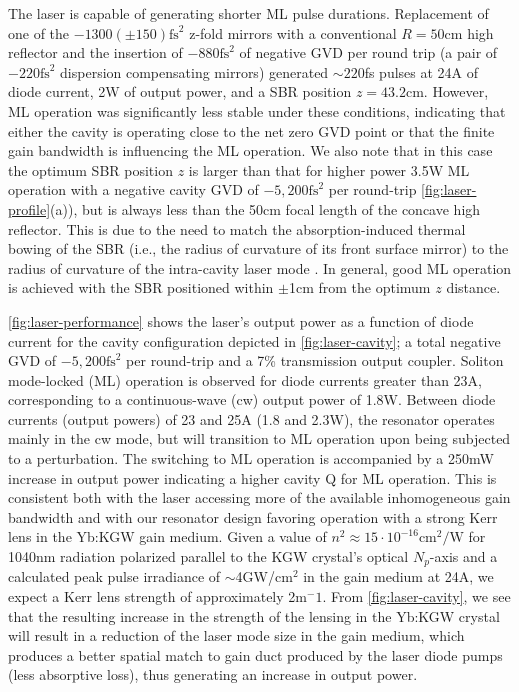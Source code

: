 The laser is capable of generating shorter ML pulse durations.
Replacement of one of the $-1300 ( \pm 150 ) \text{fs}^2$ z-fold mirrors with a conventional $R = 50$cm high reflector and the insertion of $-880\text{fs}^2$ of negative GVD per round trip (a pair of $-220\text{fs}^2$ dispersion compensating mirrors) generated $\sim220$fs pulses at 24A of diode current, 2W of output power, and a SBR position $z = 43.2$cm.
However, ML operation was significantly less stable under these conditions, indicating that either the cavity is operating close to the net zero GVD point or that the finite gain bandwidth is influencing the ML operation.
We also note that in this case the optimum SBR position $z$ is larger than that for higher power 3.5W ML operation with a negative cavity GVD of $-5,200\text{fs}^2$ per round-trip \ref{fig:laser-profile}(a)), but is always less than the 50cm focal length of the concave high reflector.
This is due to the need to match the absorption-induced thermal bowing of the SBR (i.e., the radius of curvature of its front surface mirror) to the radius of curvature of the intra-cavity laser mode \cite{Schieffer_dual_passive_2006}.
In general, good ML operation is achieved with the SBR positioned within $\pm$1cm from the optimum $z$ distance.

\ref{fig:laser-performance} shows the laser's output power as a function of diode current for the cavity configuration depicted in \ref{fig:laser-cavity}; a total negative GVD of $-5,200\text{fs}^2$ per round-trip and a 7\% transmission output coupler.
Soliton mode-locked (ML) operation is observed for diode currents greater than 23A, corresponding to a continuous-wave (cw) output power of 1.8W.
Between diode currents (output powers) of 23 and 25A (1.8 and 2.3W), the resonator operates mainly in the cw mode, but will transition to ML operation upon being subjected to a perturbation.
The switching to ML operation is accompanied by a 250mW increase in output
power indicating a higher cavity Q for ML operation.
This is consistent both with the laser accessing more of the available inhomogeneous gain bandwidth and with our resonator design favoring operation with a strong Kerr lens in the Yb:KGW gain medium.
Given a value of $n^2 \approx 15 \cdot 10^{-16}\text{cm}^2/\text{W}$ for 1040nm radiation polarized parallel to the KGW crystal's optical $N_p$-axis \cite{Major_characterization_2003,Selivanov_nonlinear_2006,Vodchits_zscan_2006} and a calculated peak pulse irradiance of $\sim$4GW/cm$^2$ in the gain medium at 24A, we expect a Kerr lens strength of approximately 2m$^-1$.
From \ref{fig:laser-cavity}, we see that the resulting increase in the strength of the lensing in the Yb:KGW crystal will result in a reduction of the laser mode size in the gain medium, which produces a better spatial match to gain duct produced by the laser diode pumps (less absorptive loss), thus generating an increase in output power.

